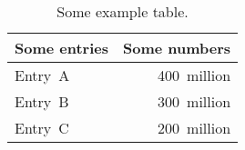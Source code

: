 \begin{table}[t]
 \caption{Some example table.}
 \label{table-example}
 \centering
 \small
 \begin{tabular}{@{}lr@{}}
  \toprule
  Some entries & Some numbers \\
  \midrule
  Entry~A      & 400~million  \\
  Entry~B      & 300~million  \\
  Entry~C      & 200~million  \\
  \bottomrule
 \end{tabular}
\end{table}

